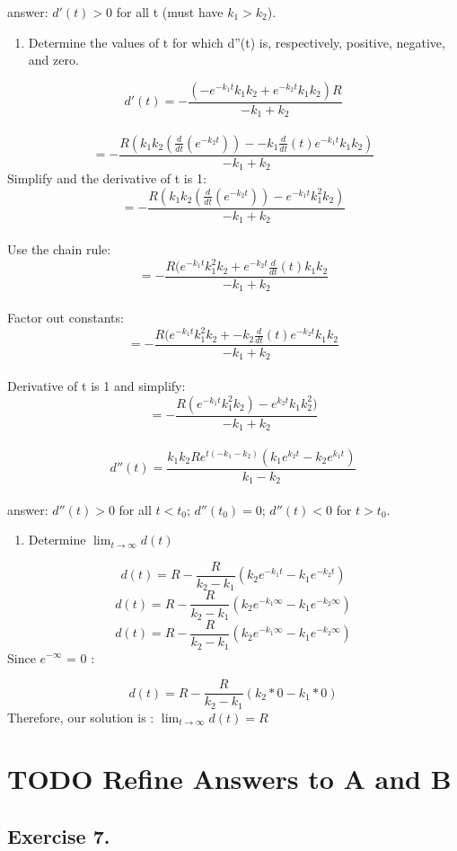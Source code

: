 \documentclass[]{article}
\providecommand{\tightlist}{%
  \setlength{\itemsep}{0pt}\setlength{\parskip}{0pt}}
\begin{document}
answer: \(d'(t) > 0\) for all t (must have \(k_1 > k_2\)).

\begin{enumerate}
\def\labelenumi{(\alph{enumi})}
\setcounter{enumi}{1}
\tightlist
\item
  Determine the values of t for which d''(t) is, respectively, positive,
  negative, and zero.
\end{enumerate}

\[d'(t) = -\frac{(-e^{-k_1 t}k_1 k_2 + e^{-k_2 t}k_1 k_2)R}{-k_1 + k_2}\]\\
\[= -\frac{R(k_1 k_2 (\frac{d}{dt}(e^{-k_2 t})) - -k_1 \frac{d}{dt}(t)e^{-k_1 t}k_1 k_2 )}{-k_1 + k_2}\]
Simplify and the derivative of t is 1:
\[= -\frac{R(k_1 k_2 (\frac{d}{dt}(e^{-k_2 t})) - e^{-k_1 t}k_1^2 k_2 )}{-k_1 + k_2}\]\\
Use the chain rule:
\[= -\frac{R(e^{-k_1 t}k_1^2 k_2 + e^{-k_2 t} \frac{d}{dt}(t)k_1 k_2 }{-k_1 + k_2}\]\\
Factor out constants:
\[= -\frac{R(e^{-k_1 t}k_1^2 k_2 + - k_2 \frac{d}{dt}(t) e^{-k_2 t}k_1 k_2} {-k_1 + k_2}\]\\
Derivative of t is 1 and simplify:
\[= - \frac{R (e^{-k_1 t}k_1^2 k_2) - e^{k_2 t} k_1 k_2^2)}{-k_1 + k_2}\]\\
\[d''(t) = \frac{k_1 k_2 R e^{t(-k_1-k_2)}(k_1 e^{k_2 t}-k_2 e^{k_1 t})}{k_1 - k_2}\]\\
answer: \(d''(t) > 0\) for all \(t < t_0\); \(d''(t_0) =0\);
\(d''(t) < 0\) for \(t > t_0\).

\begin{enumerate}
\def\labelenumi{(\alph{enumi})}
\setcounter{enumi}{2}
\tightlist
\item
  Determine \(\lim_{t\to\infty}d(t)\)
\end{enumerate}

\[d(t) = R - \frac{R}{k_2 - k_1}(k_2 e ^{-k_1 t} - k_1 e^{-k_2 t})\]
\[d(t) = R - \frac{R}{k_2 - k_1}(k_2 e ^{-k_1 \infty} - k_1 e^{-k_2 \infty})\]
\[d(t) = R - \frac{R}{k_2 - k_1}(k_2 e ^{-k_1 \infty} - k_1 e^{-k_2 \infty})\]
Since \(e^{-\infty}\) = 0 :

\[d(t) = R - \frac{R}{k_2 - k_1}(k_2*0 - k_1*0)\] Therefore, our
solution is : \(\lim_{t\to\infty}d(t) =R\)

\section{TODO Refine Answers to A and
B}\label{todo-refine-answers-to-a-and-b}

\subsection{Exercise 7.}\label{exercise-7.}
\end{document}
